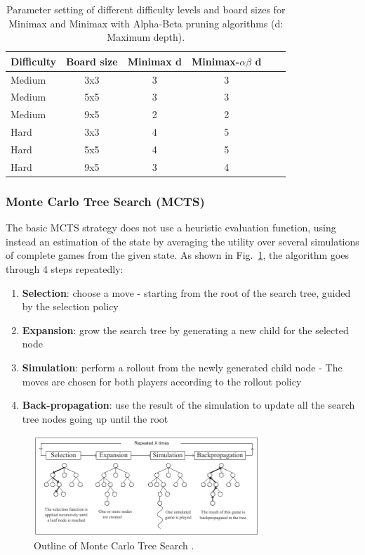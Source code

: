 \documentclass[journal]{IEEEtran}
\begin{document}
\begin{table}[h]
    \caption{Parameter setting of different difficulty levels and board sizes for Minimax and Minimax with Alpha-Beta pruning algorithms (d: Maximum depth).}
    \centering
    \label{tab:Minimax_details}
        \begin{tabular}{l c c c c c}
        \hline
        Difficulty & Board size & Minimax d & Minimax-$\alpha\beta$ d\\
        \hline
        Medium & 3x3 & 3 & 3\\
        Medium & 5x5 & 3 & 3\\
        Medium & 9x5 & 2 & 2\\
        \addlinespace
        Hard & 3x3 & 4 & 5\\
        Hard & 5x5 & 4 & 5\\
        Hard & 9x5 & 3 & 4\\
        \hline
        \end{tabular}
\end{table}

\subsubsection{\textbf{Monte Carlo Tree Search (MCTS)}}

The basic MCTS strategy does not use a heuristic evaluation function, using instead an estimation of the state by averaging the utility over several simulations of complete games from the given state. As shown in Fig.~\ref{fig:Outline_MCTS}, the algorithm goes through 4 steps repeatedly:

\begin{enumerate}
    \item \textbf{Selection}: choose a move - starting from the root of the search tree, guided by the selection policy
    \item \textbf{Expansion}: grow the search tree by generating a new child for the selected node
    \item \textbf{Simulation}: perform a rollout from the newly generated child node - The moves are chosen for both players according to the rollout policy
    \item \textbf{Back-propagation}: use the result of the simulation to update all the search tree nodes going up until the root
\end{enumerate}

\begin{figure}[h!]
    \centering
    \includegraphics[width = 8.5cm]{Outline_MCTS}
    \caption{Outline of Monte Carlo Tree Search \cite{Chaslot2008}.}
    \label{fig:Outline_MCTS}
\end{figure}
\end{document}
